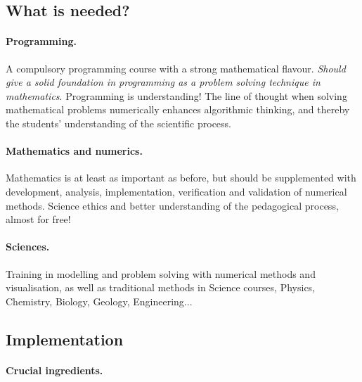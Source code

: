 \documentclass[%
twoside,                 %
final,                   %
10pt]{article}
\begin{document}
\noindent




\subsection*{What is needed?}

\paragraph{Programming.}
A compulsory programming course with a strong mathematical flavour. \emph{Should give a solid foundation in programming as a problem solving technique in mathematics}. Programming is understanding! The line of thought when solving mathematical problems numerically enhances algorithmic thinking,  and thereby the students' understanding of the scientific process.




\paragraph{Mathematics and numerics.}
Mathematics is at least as important as before, but should be supplemented with development, analysis, implementation, verification and validation of numerical methods. Science ethics and better understanding of the pedagogical process, almost for free!




\paragraph{Sciences.}
Training in modelling and problem solving with numerical methods and visualisation, as well as traditional methods in Science courses, Physics, Chemistry, Biology, Geology, Engineering...





\subsection*{Implementation}

\paragraph{Crucial ingredients.}
\end{document}
